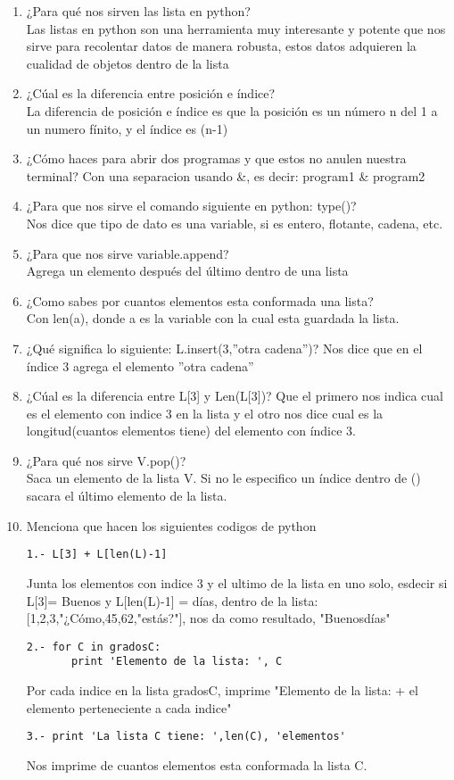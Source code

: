 \documentclass{book}
\begin{document}
\begin{enumerate}
	\item ¿Para qué nos sirven las lista en python?\\
	Las listas en python son una herramienta muy interesante y potente que nos sirve para recolentar datos de manera robusta, estos datos adquieren la cualidad de objetos dentro de la lista
	\item ¿Cúal es la diferencia entre posición e índice?\\
	La diferencia de posición e índice es que la posición es un número n del 1 a un numero fínito, y el índice es (n-1)
	\item ¿Cómo haces para abrir dos programas y que estos no anulen nuestra terminal?
	Con una separacion usando \&, es decir: program1 \& program2
	\item ¿Para que nos sirve el comando siguiente en python: type()?\\
	Nos dice que tipo de dato es una variable, si es entero, flotante, cadena, etc.
	\item ¿Para que nos sirve variable.append?\\
	Agrega un elemento después del último dentro de una lista
	\item ¿Como sabes por cuantos elementos esta conformada una lista?\\
	Con len(a), donde a es la variable con la cual esta guardada la lista.
	\item ¿Qué significa lo siguiente: L.insert(3,”otra cadena”)?
	Nos dice que en el índice 3 agrega el elemento ”otra cadena”
	\item ¿Cúal es la diferencia entre L[3] y Len(L[3])?
	Que el primero nos indica cual es el elemento con indice 3 en la lista y el otro nos dice cual es la longitud(cuantos elementos tiene) del elemento con índice 3.
	\item ¿Para qué nos sirve V.pop()?\\
	Saca un elemento de la lista V. Si no le especifico un índice dentro de () sacara el último elemento de la lista.
	\newpage
	\item Menciona que hacen los siguientes codigos de python
	\begin{verbatim}
1.- L[3] + L[len(L)-1] 
	\end{verbatim}
	Junta los elementos con indice 3 y el ultimo de la lista en uno solo, esdecir si L[3]= Buenos y L[len(L)-1] = días, dentro de la lista:
	[1,2,3,"¿Cómo,45,62,"estás?"], nos da como resultado, "Buenosdías"
	\begin{verbatim}
2.- for C in gradosC:
       print 'Elemento de la lista: ', C
	\end{verbatim}
	Por cada indice en la lista gradosC, imprime "Elemento de la lista: + el elemento perteneciente a cada indice" 
	\begin{verbatim}
3.- print 'La lista C tiene: ',len(C), 'elementos'
	\end{verbatim}
	Nos imprime de cuantos elementos esta conformada la lista C.
	
	
\end{enumerate}%
\end{document}
